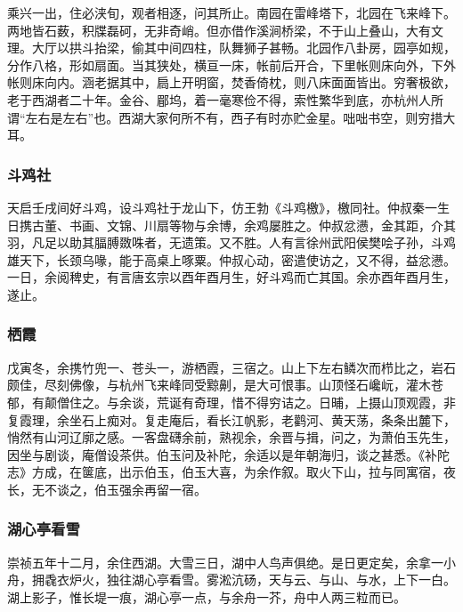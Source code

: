 \documentclass[]{article}
\begin{document}
乘兴一出，住必浃旬，观者相逐，问其所止。南园在雷峰塔下，北园在飞来峰下。两地皆石薮，积牒磊砢，无非奇峭。但亦借作溪涧桥梁，不于山上叠山，大有文理。大厅以拱斗抬梁，偷其中间四柱，队舞狮子甚畅。北园作八卦房，园亭如规，分作八格，形如扇面。当其狭处，横亘一床，帐前后开合，下里帐则床向外，下外帐则床向内。涵老据其中，扃上开明窗，焚香倚枕，则八床面面皆出。穷奢极欲，老于西湖者二十年。金谷、郿坞，着一毫寒俭不得，索性繁华到底，亦杭州人所谓``左右是左右''也。西湖大家何所不有，西子有时亦贮金星。咄咄书空，则穷措大耳。

\hypertarget{header-n255}{%
\subsubsection{斗鸡社}\label{header-n255}}

天启壬戌间好斗鸡，设斗鸡社于龙山下，仿王勃《斗鸡檄》，檄同社。仲叔秦一生日携古董、书画、文锦、川扇等物与余博，余鸡屡胜之。仲叔忿懑，金其距，介其羽，凡足以助其腷膊敪咮者，无遗策。又不胜。人有言徐州武阳侯樊哙子孙，斗鸡雄天下，长颈乌喙，能于高桌上啄粟。仲叔心动，密遣使访之，又不得，益忿懑。一日，余阅稗史，有言唐玄宗以酉年酉月生，好斗鸡而亡其国。余亦酉年酉月生，遂止。

\hypertarget{header-n260}{%
\subsubsection{栖霞}\label{header-n260}}

戊寅冬，余携竹兜一、苍头一，游栖霞，三宿之。山上下左右鳞次而栉比之，岩石颇佳，尽刻佛像，与杭州飞来峰同受黥劓，是大可恨事。山顶怪石巉岏，灌木苍郁，有颠僧住之。与余谈，荒诞有奇理，惜不得穷诘之。日晡，上摄山顶观霞，非复霞理，余坐石上痴对。复走庵后，看长江帆影，老鹳河、黄天荡，条条出麓下，悄然有山河辽廓之感。一客盘礴余前，熟视余，余晋与揖，问之，为萧伯玉先生，因坐与剧谈，庵僧设茶供。伯玉问及补陀，余适以是年朝海归，谈之甚悉。《补陀志》方成，在箧底，出示伯玉，伯玉大喜，为余作叙。取火下山，拉与同寓宿，夜长，无不谈之，伯玉强余再留一宿。

\hypertarget{header-n265}{%
\subsubsection{湖心亭看雪}\label{header-n265}}

崇祯五年十二月，余住西湖。大雪三日，湖中人鸟声俱绝。是日更定矣，余拿一小舟，拥毳衣炉火，独往湖心亭看雪。雾淞沆砀，天与云、与山、与水，上下一白。湖上影子，惟长堤一痕，湖心亭一点，与余舟一芥，舟中人两三粒而已。
\end{document}
